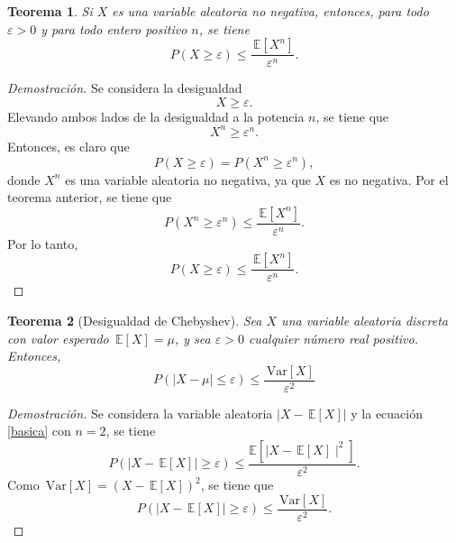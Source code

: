 \documentclass[12pt,letterpaper]{article}
\newcommand\var[1]{\, \mathrm{Var}\left\lbrack #1 \right\rbrack}
\newcommand\esp[1]{\, \mathbb{E} \left\lbrack #1 \right\rbrack}
\newtheorem{teo}{Teorema}
\begin{document}
\begin{teo}
Si $X$ es una variable aleatoria no negativa, entonces, para todo $\varepsilon > 0$ y para todo entero positivo $n$, se tiene 
\begin{equation}
P(X \geqslant \varepsilon) \leqslant \frac{\esp{X^n}}{\varepsilon^n}.
\end{equation}
\end{teo}
\begin{proof}[Demostración]
Se considera la desigualdad 
\begin{equation}
X \geqslant \varepsilon.
\end{equation}
Elevando ambos lados de la desigualdad a la potencia $n$, se tiene que
\begin{equation}
X^n \geqslant \varepsilon^n.
\end{equation}
Entonces, es claro que
\begin{equation}
P(X \geqslant \varepsilon) = P(X^n \geqslant \varepsilon^n),
\end{equation}
donde $X^n$ es una variable aleatoria no negativa, ya que $X$ es no negativa. Por el teorema anterior, se tiene que
\begin{equation}
P(X^n \geqslant \varepsilon^n) \leqslant \frac{\esp{X^n}}{\varepsilon^n}.
\end{equation}
Por lo tanto,
\begin{equation}
\label{basica}
P(X \geqslant \varepsilon) \leqslant \frac{\esp{X^n}}{\varepsilon^n}.
\end{equation}
\end{proof}
\begin{teo}[Desigualdad de Chebyshev]
Sea $X$ una variable aleatoria discreta con valor esperado $\esp{X}=\mu$, y sea $\varepsilon > 0$ cualquier número real positivo. Entonces,
\begin{equation}
P\left(|X-\mu| \leqslant \varepsilon \right) \leqslant \frac{\var{X}}{\varepsilon^2}
\end{equation}
\end{teo}
\begin{proof}[Demostración]
Se considera la variable aleatoria $|X-\esp{X}|$ y la ecuación \ref{basica} con $n=2$, se tiene
\begin{equation}
P(|X-\esp{X}|\geqslant \varepsilon) \leqslant \frac{\mathbb{E}\left[\mid X - \esp{X}\mid ^2 \right]}{\varepsilon^2}.
\end{equation}
Como $\var{X} = (X - \esp{X})^2$, se tiene que
\begin{equation}
P(|X-	\esp{X}|\geqslant \varepsilon) \leqslant \frac{\var{X}}{\varepsilon^2}.
\end{equation}
\end{proof}
\end{document}
